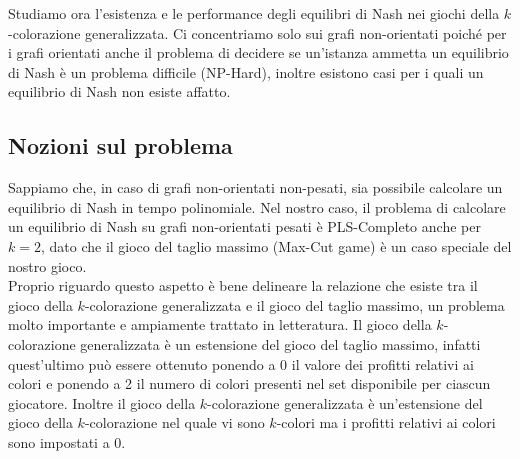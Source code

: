 Studiamo ora l'esistenza e le performance degli equilibri di Nash nei giochi della \(k\)-colorazione generalizzata. Ci concentriamo solo sui grafi non-orientati poiché per i grafi orientati anche il problema di decidere se un'istanza ammetta un equilibrio di Nash è un problema difficile (NP-Hard), inoltre esistono casi per i quali un equilibrio di Nash non esiste affatto.\\

\subsection{Nozioni sul problema}
\justify
Sappiamo che, in caso di grafi non-orientati non-pesati, sia possibile calcolare un equilibrio di Nash in tempo polinomiale. Nel nostro caso, il problema di calcolare un equilibrio di Nash su grafi non-orientati pesati è PLS-Completo anche per \(k = 2\), dato che il gioco del taglio massimo (Max-Cut game) è un caso speciale del nostro gioco.\\
Proprio riguardo questo aspetto è bene delineare la relazione che esiste tra il gioco della \(k\)-colorazione generalizzata e il gioco del taglio massimo, un problema molto importante e ampiamente trattato in letteratura. Il gioco della \(k\)-colorazione generalizzata è un estensione del gioco del taglio massimo, infatti quest'ultimo può essere ottenuto ponendo a 0 il valore dei profitti relativi ai colori e ponendo a 2 il numero di colori presenti nel set disponibile per ciascun giocatore. Inoltre il gioco della \(k\)-colorazione generalizzata è un'estensione del gioco della \(k\)-colorazione nel quale vi sono \(k\)-colori ma i profitti relativi ai colori sono impostati a 0.\\

